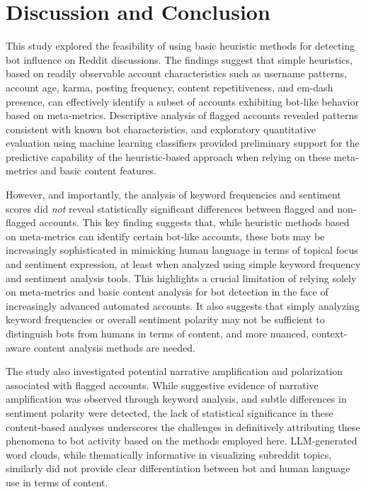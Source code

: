 \documentclass[
  12pt,
  letterpaper,
  DIV=11,
  numbers=noendperiod]{scrartcl}
\begin{document}
\section{Discussion and Conclusion}\label{discussion-and-conclusion}

This study explored the feasibility of using basic heuristic methods for
detecting bot influence on Reddit discussions. The findings suggest that
simple heuristics, based on readily observable account characteristics
such as username patterns, account age, karma, posting frequency,
content repetitiveness, and em-dash presence, can effectively identify a
subset of accounts exhibiting bot-like behavior based on meta-metrics.
Descriptive analysis of flagged accounts revealed patterns consistent
with known bot characteristics, and exploratory quantitative evaluation
using machine learning classifiers provided preliminary support for the
predictive capability of the heuristic-based approach when relying on
these meta-metrics and basic content features.

However, and importantly, the analysis of keyword frequencies and
sentiment scores did \emph{not} reveal statistically significant
differences between flagged and non-flagged accounts. This key finding
suggests that, while heuristic methods based on meta-metrics can
identify certain bot-like accounts, these bots may be increasingly
sophisticated in mimicking human language in terms of topical focus and
sentiment expression, at least when analyzed using simple keyword
frequency and sentiment analysis tools. This highlights a crucial
limitation of relying solely on meta-metrics and basic content analysis
for bot detection in the face of increasingly advanced automated
accounts. It also suggests that simply analyzing keyword frequencies or
overall sentiment polarity may not be sufficient to distinguish bots
from humans in terms of content, and more nuanced, context-aware content
analysis methods are needed.

The study also investigated potential narrative amplification and
polarization associated with flagged accounts. While suggestive evidence
of narrative amplification was observed through keyword analysis, and
subtle differences in sentiment polarity were detected, the lack of
statistical significance in these content-based analyses underscores the
challenges in definitively attributing these phenomena to bot activity
based on the methods employed here. LLM-generated word clouds, while
thematically informative in visualizing subreddit topics, similarly did
not provide clear differentiation between bot and human language use in
terms of content.
\end{document}
